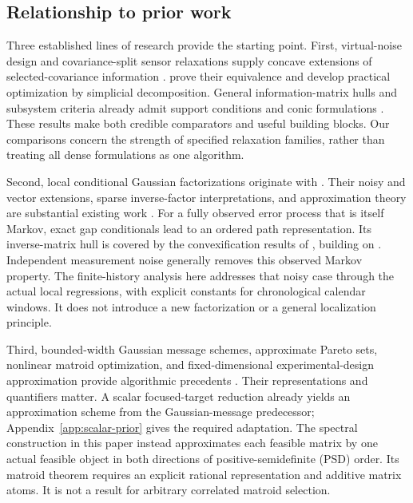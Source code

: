 \subsection{Relationship to prior work}\label{subsec:intro-prior}

Three established lines of research provide the starting point.
First, virtual-noise design and covariance-split sensor relaxations supply
concave extensions of selected-covariance information
\citep{Liu2016,Pazman2022}. \citet[Proposition 3]{Hainy2025} prove their
equivalence and develop practical optimization by simplicial decomposition.
General information-matrix hulls and subsystem criteria already admit support
conditions and conic formulations \citep{HarmanTrnovska2009,Sagnol2015}.
These results make both credible comparators and useful building blocks.
Our comparisons concern the strength of specified relaxation families, rather
than treating all dense formulations as one algorithm.

Second, local conditional Gaussian factorizations originate with
\citet{Vecchia1988}. Their noisy and vector extensions, sparse inverse-factor
interpretations, and approximation theory are substantial existing work
\citep{KatzfussGuinness2021,Schafer2021,Huan2025,KaminetzWebber2026}.
For a fully observed error process that is itself Markov, exact gap
conditionals lead to an ordered path representation. Its inverse-matrix hull
is covered by the convexification results of \citet{Lee2026}, building on
\citet{Wei2023}. Independent measurement noise generally removes this observed
Markov property. The finite-history analysis here addresses that noisy case
through the actual local regressions, with explicit constants for chronological
calendar windows. It does not introduce a new factorization or a general
localization principle.

Third, bounded-width Gaussian message schemes, approximate Pareto sets,
nonlinear matroid optimization, and fixed-dimensional experimental-design
approximation provide algorithmic precedents
\citep{Mahalanabis2012,Papadimitriou2000,Tsaggouris2009,Berstein2008,Brown2024}.
Their representations and quantifiers matter. A scalar focused-target
reduction already yields an approximation scheme from the Gaussian-message
predecessor; Appendix~\ref{app:scalar-prior} gives the required adaptation.
The spectral construction in this paper instead approximates each feasible
matrix by one actual feasible object in both directions of positive-semidefinite
(PSD) order. Its
matroid theorem requires an explicit rational representation and additive
matrix atoms. It is not a result for arbitrary correlated matroid selection.

